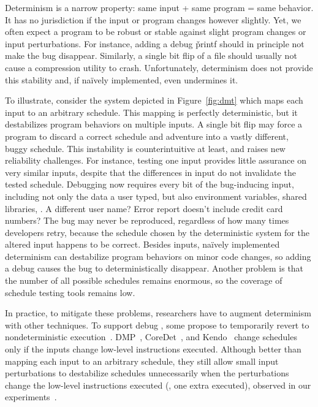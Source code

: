 Determinism is a
narrow property: same input + same program = same behavior. It has no
jurisdiction if the input or program changes however slightly.  Yet, we
often expect a program to be robust or stable against slight program
changes or input perturbations.  For instance, adding a debug \v{printf}
should in principle not make the bug disappear.  Similarly, a single bit flip of
a file should usually not cause a compression utility to crash. Unfortunately,
determinism does not provide this stability and, if na\"{i}vely implemented,
even undermines it.

To illustrate, consider the system depicted in
Figure~\ref{fig:dmt} which maps each input to an arbitrary schedule. This
mapping is perfectly deterministic, but it destabilizes program
behaviors on multiple inputs.  A single bit flip may force a program to
discard a correct schedule and adventure into a vastly different, buggy
schedule. This instability is counterintuitive at least,
and raises new reliability challenges.  For instance, testing one input
provides little assurance on very similar inputs, despite that the differences
in input do not invalidate the tested schedule.  Debugging now requires
every bit of the bug-inducing input, including not only the data a user
typed, but also environment variables, shared libraries, \etc.  A
different user name?  Error report doesn't include credit card numbers?
The bug may never be reproduced, regardless of how many times developers
retry, because the schedule chosen by the deterministic system for the
altered input happens to be correct. Besides inputs, na\"{i}vely implemented
determinism can destabilize program behaviors on minor code changes, so adding a
debug  causes the bug to deterministically disappear.  Another
problem is that the number of all possible schedules remains enormous, so the
coverage of schedule testing tools remains low.

In practice, to mitigate these problems, researchers have to augment
determinism with other techniques.  To support debug , some
propose to temporarily revert to nondeterministic
execution~\cite{dmp:asplos09}.  DMP~\cite{dmp:asplos09},
CoreDet~\cite{coredet:asplos10}, and Kendo~\cite{kendo:asplos09} change
schedules only if the inputs change low-level instructions executed.
Although better than mapping each input to an arbitrary schedule, they
still allow small input perturbations to destabilize schedules
unnecessarily when the perturbations change the low-level instructions
executed (\eg, one extra  executed), observed in our
experiments~\cite{cui:tern:osdi10}.

